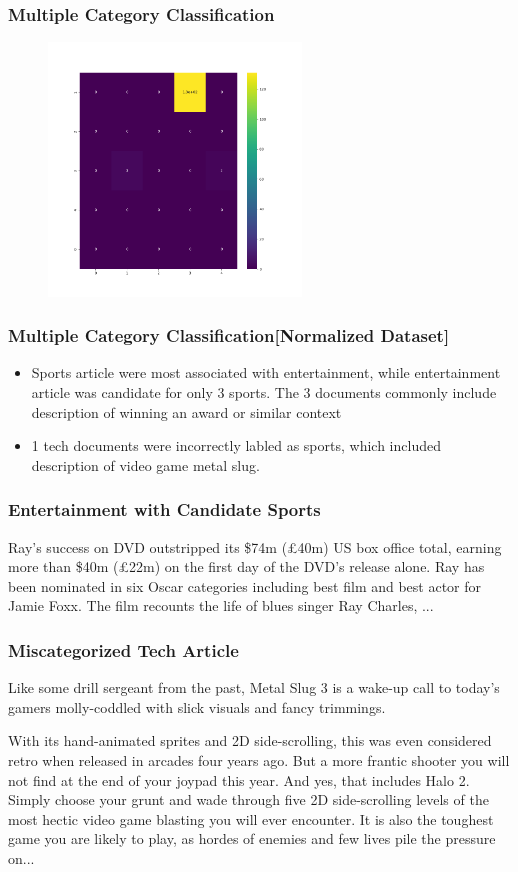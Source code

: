 \documentclass[
  10pt %
  16:9, %
]{beamer}
\begin{document}
\begin{frame}
  \frametitle{Multiple Category Classification}
  \begin{figure}
    \centering
    \includegraphics[width=0.6\textwidth]{candidate_relation.png}
  \end{figure}
\end{frame}

\begin{frame}
  \frametitle{Multiple Category Classification[Normalized Dataset]}
  \begin{itemize}
    \item Sports article were most associated with entertainment, while entertainment article was candidate for only 3 sports. The 3 documents commonly include description of winning an award or similar context
    \item 1 tech documents were incorrectly labled as sports, which included description of video game metal slug.
  \end{itemize}
\end{frame}

\begin{frame}
  \frametitle{Entertainment with Candidate Sports}

Ray's success on DVD outstripped its \$74m (£40m) US box office total, earning more than \$40m (£22m) on the first day of the DVD's release alone. Ray has been nominated in six Oscar categories including best film and best actor for Jamie Foxx. The film recounts the life of blues singer Ray Charles, ...
\end{frame}

\begin{frame}
  \frametitle{Miscategorized Tech Article}
Like some drill sergeant from the past, Metal Slug 3 is a wake-up call to today's gamers molly-coddled with slick visuals and fancy trimmings.

With its hand-animated sprites and 2D side-scrolling, this was even considered retro when released in arcades four years ago. But a more frantic shooter you will not find at the end of your joypad this year. And yes, that includes Halo 2. Simply choose your grunt and wade through five 2D side-scrolling levels of the most hectic video game blasting you will ever encounter. It is also the toughest game you are likely to play, as hordes of enemies and few lives pile the pressure on...
\end{frame}
\end{document}
